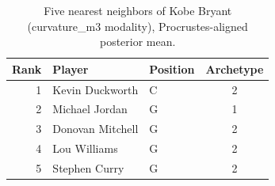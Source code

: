 \begin{table}[htbp]
  \centering\small
  \begin{tabular}{rllc}
    \toprule
    Rank & Player & Position & Archetype \\
    \midrule
    1 & Kevin Duckworth & C & 2 \\
    2 & Michael Jordan & G & 1 \\
    3 & Donovan Mitchell & G & 2 \\
    4 & Lou Williams & G & 2 \\
    5 & Stephen Curry & G & 2 \\
    \bottomrule
  \end{tabular}
  \caption{Five nearest neighbors of Kobe Bryant (curvature_m3 modality), Procrustes-aligned posterior mean.}
  \label{tab:Kobe_Bryant_neighbors_curvature_m3}
\end{table}

